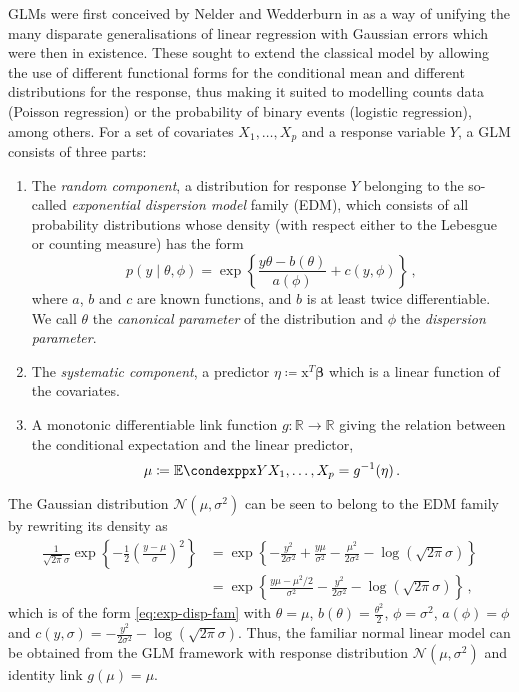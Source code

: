 \documentclass[a4paper]{book}
\begin{document}
GLMs were first conceived by Nelder and Wedderburn in \cite{nelder} as a way of unifying the many disparate generalisations of linear regression with Gaussian errors which were then in existence. These sought to extend the classical model by allowing the use of different functional forms for the conditional mean and different distributions for the response, thus making it suited to modelling counts data (Poisson regression) or the probability of binary events (logistic regression), among others. For a set of covariates $X_1, \dots, X_p$ and a response variable $Y$, a GLM consists of three parts:
\begin{enumerate}
  \item The \emph{random component}, a distribution for response $Y$ belonging to the so-called \emph{exponential dispersion model} family (EDM), which consists of all probability distributions whose density (with respect either to the Lebesgue or counting measure) has the form
  \begin{equation} \label{eq:exp-disp-fam}
    p(y \mid \theta, \phi) = \exp \left \{ \frac{y \theta - b(\theta)}{a(\phi)} + c(y, \phi) \right \} \,,
  \end{equation}
  where $a$, $b$ and $c$ are known functions, and $b$ is at least twice differentiable. We call $\theta$ the \emph{canonical parameter} of the distribution and $\phi$ the \emph{dispersion parameter}.
  \item The \emph{systematic component}, a predictor $\eta \coloneqq \bm{\mathrm{x}}^T \bm{\beta}$ which is a linear function of the covariates.
  \item A monotonic differentiable link function $g: \mathbb{R} \rightarrow \mathbb{R}$ giving the relation between the conditional expectation and the linear predictor,
  \begin{equation}
    \mu \coloneqq \condexpp{Y}{X_1, \dots, X_p} = g^{-1}(\eta) \,.
  \end{equation}
\end{enumerate}
The Gaussian distribution $\mathcal{N}(\mu, \sigma^2)$ can be seen to belong to the EDM family by rewriting its density as
\begin{align}
  \frac{1}{\sqrt{2 \pi} \sigma} \exp \left \{ -\frac{1}{2} \left( \frac{y - \mu}{\sigma} \right)^2\right \} &= \exp \left \{ -\frac{y^2}{2 \sigma^2} + \frac{y \mu}{\sigma^2} - \frac{\mu^2}{2 \sigma^2} - \log(\sqrt{2 \pi} \sigma) \right \} \\
  &= \exp \left \{ \frac{y \mu - \mu^2 / 2}{\sigma^2} - \frac{y^2}{2 \sigma^2} - \log(\sqrt{2 \pi} \sigma) \right \} \,,
\end{align}
which is of the form \cref{eq:exp-disp-fam} with $\theta = \mu$, $b(\theta) = \frac{\theta^2}{2}$, $\phi = \sigma^2$, $a(\phi) = \phi$ and $c(y, \sigma) = -\frac{y^2}{2 \sigma^2} - \log(\sqrt{2 \pi} \sigma)$. Thus, the familiar normal linear model can be obtained from the GLM framework with response distribution $\mathcal{N}(\mu, \sigma^2)$ and identity link $g(\mu) = \mu$.
\end{document}
